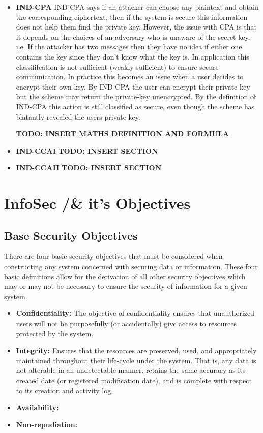 \begin{itemize}
\item \textbf{IND-CPA} IND-CPA says if an attacker can choose any plaintext and obtain the corresponding ciphertext, then if the system is secure this information does not help them find the private key. However, the issue with CPA is that it depends on the choices of an adversary who is unaware of the secret key. i.e. If the
attacker has two messages then they have no idea if either one contains the key since they don't know what the key is. 
\newline 
In application this classififcation is not sufficient (weakly sufficient) to ensure secure communication. In practice this becomes an issue when a user decides to encrypt their own key.
\newline 
By IND-CPA the user can encrypt their private-key but the scheme may return the private-key unencrypted. 
\newline 
By the definition of IND-CPA this action is still classified as secure, even though the scheme has blatantly revealed the users private key.
\newline

\textbf{TODO: INSERT MATHS DEFINITION AND FORMULA}

\item \textbf{IND-CCAI} 
\textbf{TODO: INSERT SECTION}
\item \textbf{IND-CCAII}
\textbf{TODO: INSERT SECTION}
\end{itemize}

\section{InfoSec /& it's Objectives} 

\subsection{Base Security Objectives}

There are four basic security objectives that must be considered when constructing any system concerned with securing data or information. These four basic definitions allow for the derivation of all other security objectives which may or may not be necessary to ensure the security of information for a given system.

\begin{itemize}
\item \textbf{Confidentiality:} The objective of confidentiality ensures that unauthorized users will not be purposefully (or accidentally) give access to resources protected by the system. 
\item \textbf{Integrity:} Ensures that the resources are preserved, used, and appropriately maintained throughout their life-cycle under the system. That is, any data is not alterable in an undetectable manner, retains the same
accuracy as its created date (or registered modification date), and is complete with respect to its creation and activity log. 
\item \textbf{Availability:}
\item \textbf{Non-repudiation:} 
\end{itemize}

